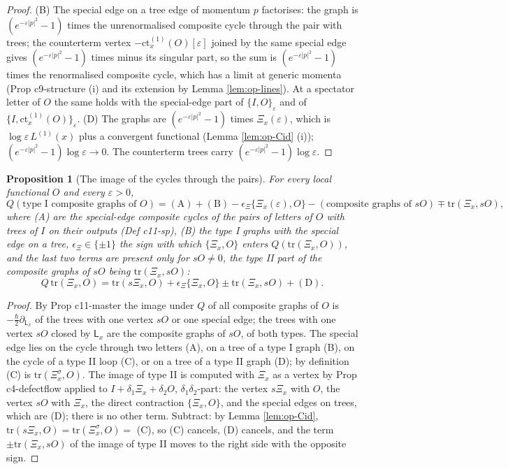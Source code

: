 \documentclass[11pt]{article}
\numberwithin{equation}{section}
\theoremstyle{plain}
\newtheorem{proposition}[theorem]{Proposition}
\theoremstyle{definition}
\newcommand{\ct}{\mathrm{ct}}
\begin{document}
\begin{proof}
(B) The special edge on a tree edge of momentum $p$ factorises: the graph is $(e^{-\varepsilon|p|^2}-1)$ times the unrenormalised composite cycle through the pair with trees; the counterterm vertex $-\ct^{(1)}_x(O)[\varepsilon]$ joined by the same special edge gives $(e^{-\varepsilon|p|^2}-1)$ times minus its singular part, so the sum is $(e^{-\varepsilon|p|^2}-1)$ times the renormalised composite cycle, which has a limit at generic momenta (Prop c9-structure (i) and its extension by Lemma \ref{lem:op-lines}). At a spectator letter of $O$ the same holds with the special-edge part of $\{I,O\}_\varepsilon$ and of $\{I,\ct^{(1)}_x(O)\}_\varepsilon$. (D) The graphs are $(e^{-\varepsilon|p|^2}-1)$ times $\Xi_x(\varepsilon)$, which is $\log\varepsilon\,L^{(1)}(x)$ plus a convergent functional (Lemma \ref{lem:op-Cid} (i)); $(e^{-\varepsilon|p|^2}-1)\log\varepsilon\to0$. The counterterm trees carry $(e^{-\varepsilon|p|^2}-1)\log\varepsilon$.
\end{proof}

\begin{proposition}[The image of the cycles through the pairs]
\label{prop:op-typeI}
For every local functional $O$ and every $\varepsilon>0$,
\[
Q(\text{type I composite graphs of }O)=(\mathrm A)+(\mathrm B)-\epsilon_\Xi\{\Xi_x(\varepsilon),O\}-(\text{composite graphs of }sO)\mp\mathrm{tr}(\Xi_x,sO),
\]
where (A) are the special-edge composite cycles of the pairs of letters of $O$ with trees of $I$ on their outputs (Def c11-sp), (B) the type I graphs with the special edge on a tree, $\epsilon_\Xi\in\{\pm1\}$ the sign with which $\{\Xi_x,O\}$ enters $Q(\mathrm{tr}(\Xi_x,O))$, and the last two terms are present only for $sO\neq0$, the type II part of the composite graphs of $sO$ being $\mathrm{tr}(\Xi_x,sO)$:
\[
Q\,\mathrm{tr}(\Xi_x,O)=\mathrm{tr}(s\Xi_x,O)+\epsilon_\Xi\{\Xi_x,O\}\pm\mathrm{tr}(\Xi_x,sO)+(\mathrm D).
\]
\end{proposition}

\begin{proof}
By Prop c11-master the image under $Q$ of all composite graphs of $O$ is $-\tfrac\hbar2\partial_{\mathsf L_x}$ of the trees with one vertex $sO$ or one special edge; the trees with one vertex $sO$ closed by $\mathsf L_x$ are the composite graphs of $sO$, of both types. The special edge lies on the cycle through two letters (A), on a tree of a type I graph (B), on the cycle of a type II loop (C), or on a tree of a type II graph (D); by definition (C) is $\mathrm{tr}(\Xi^\sigma_x,O)$. The image of type II is computed with $\Xi_x$ as a vertex by Prop c4-defectflow applied to $I+\delta_1\Xi_x+\delta_2O$, $\delta_1\delta_2$-part: the vertex $s\Xi_x$ with $O$, the vertex $sO$ with $\Xi_x$, the direct contraction $\{\Xi_x,O\}$, and the special edges on trees, which are (D); there is no other term. Subtract: by Lemma \ref{lem:op-Cid}, $\mathrm{tr}(s\Xi_x,O)=\mathrm{tr}(\Xi^\sigma_x,O)=$ (C), so (C) cancels, (D) cancels, and the term $\pm\mathrm{tr}(\Xi_x,sO)$ of the image of type II moves to the right side with the opposite sign.
\end{proof}
\end{document}

